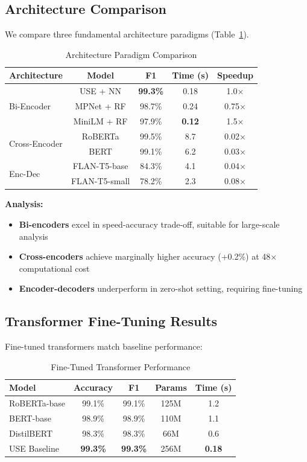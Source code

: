\documentclass[12pt,a4paper]{article}
\begin{document}
\subsection{Architecture Comparison}

We compare three fundamental architecture paradigms (Table~\ref{tab:architectures}).

\begin{table}[h]
\centering
\caption{Architecture Paradigm Comparison}
\label{tab:architectures}
\begin{tabular}{lcccc}
\toprule
\textbf{Architecture} & \textbf{Model} & \textbf{F1} & \textbf{Time (s)} & \textbf{Speedup} \\
\midrule
\multirow{3}{*}{Bi-Encoder}
  & USE + NN & \textbf{99.3\%} & 0.18 & 1.0× \\
  & MPNet + RF & 98.7\% & 0.24 & 0.75× \\
  & MiniLM + RF & 97.9\% & \textbf{0.12} & 1.5× \\
\midrule
\multirow{2}{*}{Cross-Encoder}
  & RoBERTa & 99.5\% & 8.7 & 0.02× \\
  & BERT & 99.1\% & 6.2 & 0.03× \\
\midrule
\multirow{2}{*}{Enc-Dec}
  & FLAN-T5-base & 84.3\% & 4.1 & 0.04× \\
  & FLAN-T5-small & 78.2\% & 2.3 & 0.08× \\
\bottomrule
\end{tabular}
\end{table}

\textbf{Analysis:}

\begin{itemize}
    \item \textbf{Bi-encoders} excel in speed-accuracy trade-off, suitable for large-scale analysis
    \item \textbf{Cross-encoders} achieve marginally higher accuracy (+0.2\%) at 48× computational cost
    \item \textbf{Encoder-decoders} underperform in zero-shot setting, requiring fine-tuning
\end{itemize}

\subsection{Transformer Fine-Tuning Results}

Fine-tuned transformers match baseline performance:

\begin{table}[h]
\centering
\caption{Fine-Tuned Transformer Performance}
\begin{tabular}{lcccc}
\toprule
\textbf{Model} & \textbf{Accuracy} & \textbf{F1} & \textbf{Params} & \textbf{Time (s)} \\
\midrule
RoBERTa-base & 99.1\% & 99.1\% & 125M & 1.2 \\
BERT-base & 98.9\% & 98.9\% & 110M & 1.1 \\
DistilBERT & 98.3\% & 98.3\% & 66M & 0.6 \\
\midrule
USE Baseline & \textbf{99.3\%} & \textbf{99.3\%} & 256M & \textbf{0.18} \\
\bottomrule
\end{tabular}
\end{table}
\end{document}
